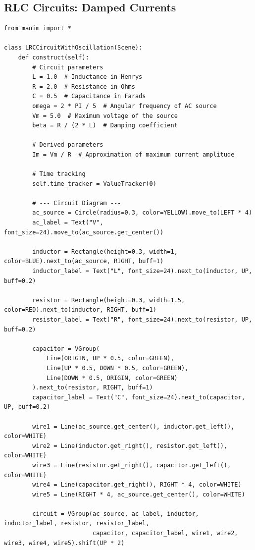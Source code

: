 \documentclass[12pt,a4paper]{article}
\begin{document}
\subsection{RLC Circuits: Damped Currents}

\begin{verbatim}
from manim import *

class LRCCircuitWithOscillation(Scene):
    def construct(self):
        # Circuit parameters
        L = 1.0  # Inductance in Henrys
        R = 2.0  # Resistance in Ohms
        C = 0.5  # Capacitance in Farads
        omega = 2 * PI / 5  # Angular frequency of AC source
        Vm = 5.0  # Maximum voltage of the source
        beta = R / (2 * L)  # Damping coefficient

        # Derived parameters
        Im = Vm / R  # Approximation of maximum current amplitude

        # Time tracking
        self.time_tracker = ValueTracker(0)

        # --- Circuit Diagram ---
        ac_source = Circle(radius=0.3, color=YELLOW).move_to(LEFT * 4)
        ac_label = Text("V", font_size=24).move_to(ac_source.get_center())

        inductor = Rectangle(height=0.3, width=1, color=BLUE).next_to(ac_source, RIGHT, buff=1)
        inductor_label = Text("L", font_size=24).next_to(inductor, UP, buff=0.2)

        resistor = Rectangle(height=0.3, width=1.5, color=RED).next_to(inductor, RIGHT, buff=1)
        resistor_label = Text("R", font_size=24).next_to(resistor, UP, buff=0.2)

        capacitor = VGroup(
            Line(ORIGIN, UP * 0.5, color=GREEN),
            Line(UP * 0.5, DOWN * 0.5, color=GREEN),
            Line(DOWN * 0.5, ORIGIN, color=GREEN)
        ).next_to(resistor, RIGHT, buff=1)
        capacitor_label = Text("C", font_size=24).next_to(capacitor, UP, buff=0.2)

        wire1 = Line(ac_source.get_center(), inductor.get_left(), color=WHITE)
        wire2 = Line(inductor.get_right(), resistor.get_left(), color=WHITE)
        wire3 = Line(resistor.get_right(), capacitor.get_left(), color=WHITE)
        wire4 = Line(capacitor.get_right(), RIGHT * 4, color=WHITE)
        wire5 = Line(RIGHT * 4, ac_source.get_center(), color=WHITE)

        circuit = VGroup(ac_source, ac_label, inductor, inductor_label, resistor, resistor_label,
                         capacitor, capacitor_label, wire1, wire2, wire3, wire4, wire5).shift(UP * 2)


\end{verbatim}
\end{document}
